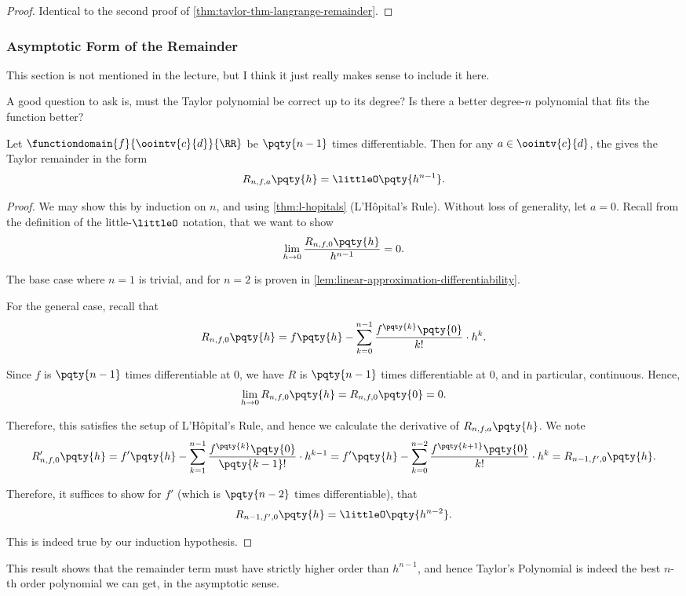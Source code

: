 \begin{proof}
    Identical to the second proof of \autoref{thm:taylor-thm-langrange-remainder}.
\end{proof}

\subsubsection{Asymptotic Form of the Remainder}

This section is not mentioned in the lecture, but I think it just really makes sense to include it here.

A good question to ask is, must the Taylor polynomial be correct up to its degree? Is there a better degree-\(n\) polynomial that fits the function better?

\begin{theorem}
    \label{thm:taylor-thm-peano-remainder}%
    Let \(\functiondomain{f}{\oointv{c}{d}}{\RR}\) be \(\pqty{n - 1}\) times differentiable. Then for any \(a \in \oointv{c}{d}\), the  gives the Taylor remainder in the form
    \[
        R_{n, f, a} \pqty{h} = \littleO\pqty{h^{n - 1}}.
    \]
\end{theorem}

\begin{proof}
    We may show this by induction on \(n\), and using \autoref{thm:l-hopitals} (L'H\^{o}pital's Rule). Without loss of generality, let \(a = 0\). Recall from the definition of the little-\(\littleO\) notation, that we want to show
    \[
        \lim_{h \to 0} \frac{R_{n, f, 0} \pqty{h}}{h^{n - 1}} = 0.
    \]

    The base case where \(n = 1\) is trivial, and for \(n = 2\) is proven in \autoref{lem:linear-approximation-differentiability}.

    For the general case, recall that
    \[
        R_{n, f, 0} \pqty{h} = f\pqty{h} - \sum_{k = 0}^{n - 1} \frac{f^{\pqty{k}} \pqty{0}}{k!} \cdot h^k.
    \]

    Since \(f\) is \(\pqty{n - 1}\) times differentiable at \(0\), we have \(R\) is \(\pqty{n - 1}\) times differentiable at \(0\), and in particular, continuous. Hence,
    \[
        \lim_{h \to 0} R_{n, f, 0} \pqty{h} = R_{n, f, 0} \pqty{0} = 0.
    \]
    
    Therefore, this satisfies the setup of L'H\^{o}pital's Rule, and hence we calculate the derivative of \(R_{n, f, a} \pqty{h}\). We note
    \[
        R'_{n, f, 0} \pqty{h} = f'\pqty{h} - \sum_{k = 1}^{n - 1} \frac{f^{\pqty{k}} \pqty{0}}{\pqty{k - 1}!} \cdot h^{k - 1} = f'\pqty{h} - \sum_{k = 0}^{n - 2} \frac{f^{\pqty{k + 1}} \pqty{0}}{k!} \cdot h^k = R_{n - 1, f', 0} \pqty{h}.
    \]

    Therefore, it suffices to show for \(f'\) (which is \(\pqty{n - 2}\) times differentiable), that
    \[
        R_{n - 1, f', 0} \pqty{h} = \littleO\pqty{h^{n - 2}}.
    \]

    This is indeed true by our induction hypothesis.
\end{proof}

This result shows that the remainder term must have strictly higher order than \(h^{n - 1}\), and hence Taylor's Polynomial is indeed the best \(n\)-th order polynomial we can get, in the asymptotic sense.